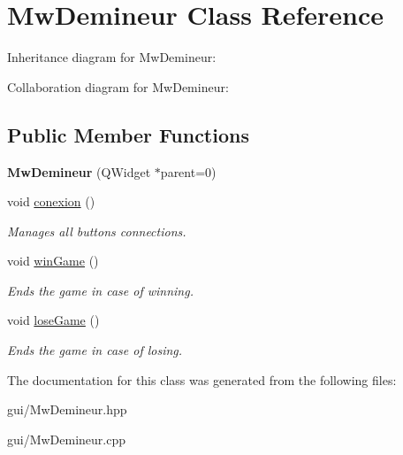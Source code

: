 \hypertarget{class_mw_demineur}{}\section{Mw\+Demineur Class Reference}
\label{class_mw_demineur}


Inheritance diagram for Mw\+Demineur\+:


Collaboration diagram for Mw\+Demineur\+:
\subsection*{Public Member Functions}
\begin{DoxyCompactItemize}
\item 
\mbox{\label{class_mw_demineur_a630e433e3a7be4fe9188112bd4ca3a75}} 
{\bfseries Mw\+Demineur} (Q\+Widget $\ast$parent=0)
\item 
\mbox{\label{class_mw_demineur_a443bb3d67e3755058bd6b21693ae7c6d}} 
void \hyperlink{class_mw_demineur_a443bb3d67e3755058bd6b21693ae7c6d}{conexion} ()
\begin{DoxyCompactList}\small\item\em Manages all buttons connections. \end{DoxyCompactList}\item 
\mbox{\label{class_mw_demineur_a4f42ef1bf1bacb3af06b52b5892f9088}} 
void \hyperlink{class_mw_demineur_a4f42ef1bf1bacb3af06b52b5892f9088}{win\+Game} ()
\begin{DoxyCompactList}\small\item\em Ends the game in case of winning. \end{DoxyCompactList}\item 
\mbox{\label{class_mw_demineur_a495aef371afbc89090fa0eda62021e9d}} 
void \hyperlink{class_mw_demineur_a495aef371afbc89090fa0eda62021e9d}{lose\+Game} ()
\begin{DoxyCompactList}\small\item\em Ends the game in case of losing. \end{DoxyCompactList}\end{DoxyCompactItemize}


The documentation for this class was generated from the following files\+:\begin{DoxyCompactItemize}
\item 
gui/Mw\+Demineur.\+hpp\item 
gui/Mw\+Demineur.\+cpp\end{DoxyCompactItemize}
